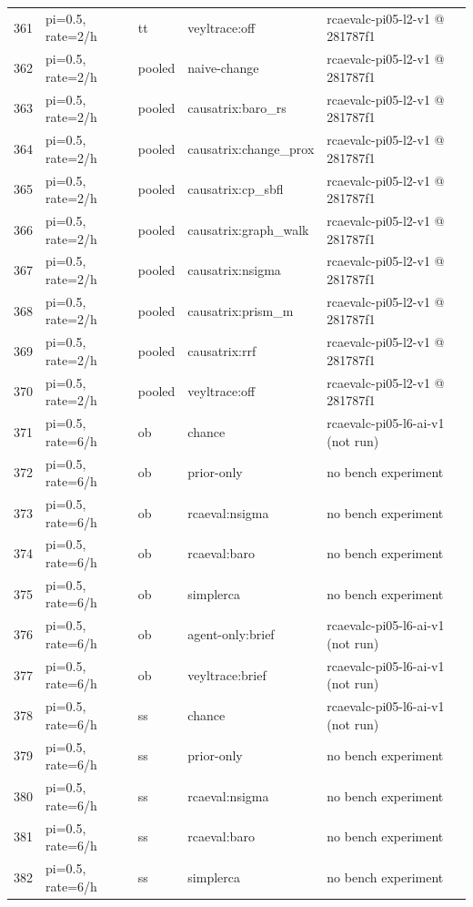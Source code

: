 \begin{longtable}{@{}r>{\raggedright\arraybackslash}p{48.0pt}>{\raggedright\arraybackslash}p{18.0pt}>{\raggedright\arraybackslash}p{108.0pt}>{\raggedright\arraybackslash}p{105.0pt}@{}}
361 & pi=0.5, rate=2/h & tt & veyltrace:off & rcaevalc-pi05-l2-v1 @ 281787f1 \\
362 & pi=0.5, rate=2/h & pooled & naive-change & rcaevalc-pi05-l2-v1 @ 281787f1 \\
363 & pi=0.5, rate=2/h & pooled & causatrix:baro\_rs & rcaevalc-pi05-l2-v1 @ 281787f1 \\
364 & pi=0.5, rate=2/h & pooled & causatrix:change\_prox & rcaevalc-pi05-l2-v1 @ 281787f1 \\
365 & pi=0.5, rate=2/h & pooled & causatrix:cp\_sbfl & rcaevalc-pi05-l2-v1 @ 281787f1 \\
366 & pi=0.5, rate=2/h & pooled & causatrix:graph\_walk & rcaevalc-pi05-l2-v1 @ 281787f1 \\
367 & pi=0.5, rate=2/h & pooled & causatrix:nsigma & rcaevalc-pi05-l2-v1 @ 281787f1 \\
368 & pi=0.5, rate=2/h & pooled & causatrix:prism\_m & rcaevalc-pi05-l2-v1 @ 281787f1 \\
369 & pi=0.5, rate=2/h & pooled & causatrix:rrf & rcaevalc-pi05-l2-v1 @ 281787f1 \\
370 & pi=0.5, rate=2/h & pooled & veyltrace:off & rcaevalc-pi05-l2-v1 @ 281787f1 \\
371 & pi=0.5, rate=6/h & ob & chance & rcaevalc-pi05-l6-ai-v1 (not run) \\
372 & pi=0.5, rate=6/h & ob & prior-only & no bench experiment \\
373 & pi=0.5, rate=6/h & ob & rcaeval:nsigma & no bench experiment \\
374 & pi=0.5, rate=6/h & ob & rcaeval:baro & no bench experiment \\
375 & pi=0.5, rate=6/h & ob & simplerca & no bench experiment \\
376 & pi=0.5, rate=6/h & ob & agent-only:brief & rcaevalc-pi05-l6-ai-v1 (not run) \\
377 & pi=0.5, rate=6/h & ob & veyltrace:brief & rcaevalc-pi05-l6-ai-v1 (not run) \\
378 & pi=0.5, rate=6/h & ss & chance & rcaevalc-pi05-l6-ai-v1 (not run) \\
379 & pi=0.5, rate=6/h & ss & prior-only & no bench experiment \\
380 & pi=0.5, rate=6/h & ss & rcaeval:nsigma & no bench experiment \\
381 & pi=0.5, rate=6/h & ss & rcaeval:baro & no bench experiment \\
382 & pi=0.5, rate=6/h & ss & simplerca & no bench experiment \\

\end{longtable}
